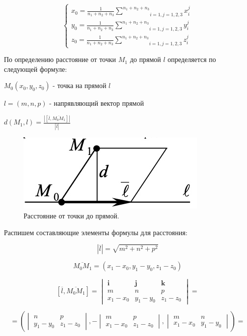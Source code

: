 \documentclass[article,final,14pt]{scrreprt}
\begin{document}
$$\begin{cases}
	x_0 = \frac{1}{n_1+n_2+n_3}\underset{i=1, j=1,2,3}{\overset{n_1+n_2+n_3}{\sum}}x_i^j \\
	y_0 = \frac{1}{n_1+n_2+n_3}\underset{i=1, j=1,2,3}{\overset{n_1+n_2+n_3}{\sum}}y_i^j \\
	z_0 = \frac{1}{n_1+n_2+n_3}\underset{i=1, j=1,2,3}{\overset{n_1+n_2+n_3}{\sum}}z_i^j
\end{cases}$$

По определению расстояние от точки $M_1$ до прямой $\mathit{l}$ определяется по следующей формуле:

$M_0 (x_0, y_0, z_0)$ - точка на прямой $\mathit{l}$

$\mathit{l} = (m, n, p)$ - напрявляющий вектор прямой

\begin{center}
	$d (M_1, \mathit{l}) = \frac{|[\overline{\mathit{l}}, \overline{M_0 M_1}]|}{|\overline{\mathit{l}}|}$
\end{center}

\begin{center}
	\begin{figure}[h]
	{ 	
		\noindent 
		\centering
		\includegraphics[scale=0.8]{3}
		\caption{Расстояние от точки до прямой.}
	}
\end{figure}
\end{center}

Распишем составляющие элементы формулы для расстояния:

$$|\overline{l}| = \sqrt{m^2 + n^2 + p^2}$$

$$\overline{M_0 M_1} = (x_1 - x_0, y_1 - y_0, z_1 - z_0)$$

$$[\overline{\mathit{l}}, \overline{M_0 M_1}] = \begin{vmatrix}
	\mathbf{i} & \mathbf{j} & \mathbf{k} \\
	m & n & p \\
	x_1 - x_0 & y_1 - y_0 & z_1 - z_0
\end{vmatrix} = $$

$$=\left(\begin{vmatrix}
	n & p \\
	y_1 - y_0 & z_1 - z_0
\end{vmatrix}, -\begin{vmatrix}
	m & p \\
	x_1 - x_0 & z_1 - z_0
\end{vmatrix}, \begin{vmatrix}
	m & n \\
	x_1 - x_0 & y_1 - y_0
\end{vmatrix}\right) = $$
\end{document}

